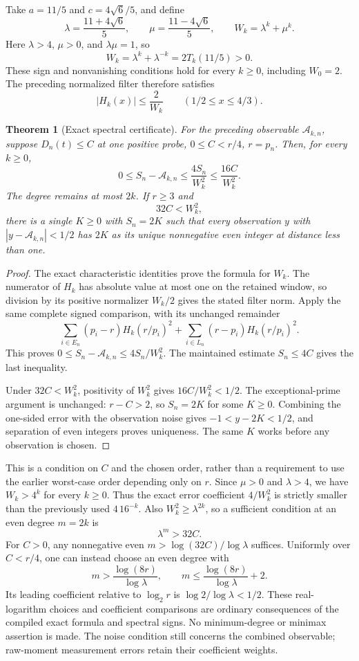\documentclass[11pt]{article}
\newtheorem{theorem}{Theorem}[section]
\theoremstyle{definition}
\begin{document}
Take $a=11/5$ and $c=4\sqrt6/5$, and define
\[
 \lambda=\frac{11+4\sqrt6}{5},\qquad
 \mu=\frac{11-4\sqrt6}{5},\qquad
 W_k=\lambda^k+\mu^k.
\]
Here $\lambda>4$, $\mu>0$, and $\lambda\mu=1$, so
\[
 W_k=\lambda^k+\lambda^{-k}
     =2T_k(11/5)>0.
\]
These sign and nonvanishing conditions hold for every $k\ge0$,
including $W_0=2$. The preceding normalized filter therefore satisfies
\[
 |H_k(x)|\le\frac{2}{W_k}
 \qquad(1/2\le x\le4/3).
\]

\begin{theorem}[Exact spectral certificate]
For the preceding observable $\mathcal A_{k,n}$, suppose
$D_n(t)\le C$ at one positive probe, $0\le C<r/4$, $r=p_n$.
Then, for every $k\ge0$,
\[
 0\le S_n-\mathcal A_{k,n}
   \le\frac{4S_n}{W_k^2}\le\frac{16C}{W_k^2}.
\]
The degree remains at most $2k$.
If $r\ge3$ and
\[
 32C<W_k^2,
\]
there is a single $K\ge0$ with $S_n=2K$ such that every observation
$y$ with $|y-\mathcal A_{k,n}|<1/2$ has $2K$ as its unique
nonnegative even integer at distance less than one.
\end{theorem}
\begin{proof}
The exact characteristic identities prove the formula for $W_k$.
The numerator of $H_k$ has absolute value at most one on the
retained window, so division by its positive normalizer $W_k/2$
gives the stated filter norm. Apply the same complete signed
comparison, with its unchanged remainder
\[
 \sum_{i\in E_n}(p_i-r)H_k(r/p_i)^2+
 \sum_{i\in L_n}(r-p_i)H_k(r/p_i)^2.
\]
This proves $0\le S_n-\mathcal A_{k,n}\le4S_n/W_k^2$.
The maintained estimate $S_n\le4C$ gives the last inequality.

Under $32C<W_k^2$, positivity of $W_k^2$ gives
$16C/W_k^2<1/2$. The exceptional-prime argument is unchanged:
$r-C>2$, so $S_n=2K$ for some $K\ge0$.
Combining the one-sided error with the observation noise gives
$-1<y-2K<1/2$, and separation of even integers proves uniqueness.
The same $K$ works before any observation is chosen.
\end{proof}

This is a condition on $C$ and the chosen order, rather than a
requirement to use the earlier worst-case order depending only on $r$.
Since $\mu>0$ and $\lambda>4$, we have $W_k>4^k$ for every $k\ge0$.
Thus the exact error coefficient $4/W_k^2$ is strictly smaller than
the previously used $4\,16^{-k}$.
Also $W_k^2\ge\lambda^{2k}$, so a sufficient condition at an even
degree $m=2k$ is
\[
 \lambda^m>32C.
\]
For $C>0$, any nonnegative even $m>\log(32C)/\log\lambda$ suffices.
Uniformly over $C<r/4$, one can instead choose an even degree with
\[
 m>\frac{\log(8r)}{\log\lambda},\qquad
 m\le\frac{\log(8r)}{\log\lambda}+2.
\]
Its leading coefficient relative to $\log_2r$ is
$\log2/\log\lambda<1/2$.
These real-logarithm choices and coefficient comparisons are ordinary
consequences of the compiled exact formula and spectral signs.
No minimum-degree or minimax assertion is made.
The noise condition still concerns the combined observable; raw-moment
measurement errors retain their coefficient weights.
\end{document}
